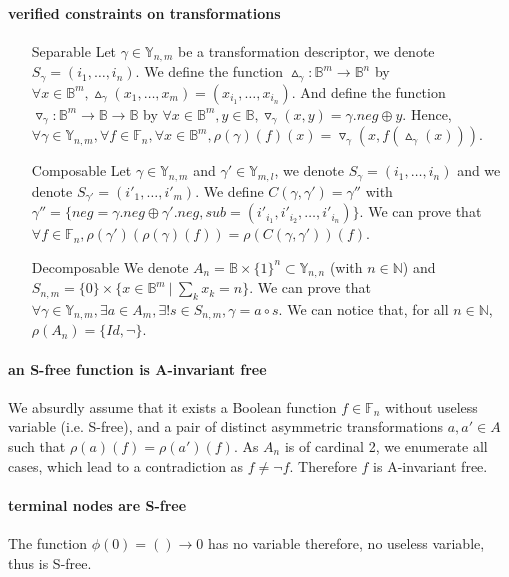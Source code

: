 \documentclass[a4paper,10pt]{article}
\newcommand{\N}{\mathbb{N}}%
\newcommand{\B}{\mathbb{B}}
\newcommand{\F}{\mathbb{F}}
\newcommand{\Y}{\mathbb{Y}}
\begin{document}
\paragraph{verified constraints on transformations}
\begin{itemize}
\item[Separable]
Let $\gamma\in\Y_{n, m}$ be a transformation descriptor, we denote $S_{\gamma} = (i_1, \dots, i_n)$.
We define the function $\vartriangle_\gamma : \B^m \longrightarrow \B^n$ by $\forall x\in\B^m, \vartriangle_\gamma(x_1, \dots, x_m) = (x_{i_1}, \dots, x_{i_n})$.
And define the function $\triangledown_\gamma : \B^m \longrightarrow \B \longrightarrow \B$ by $\forall x\in\B^m, y\in\B, \triangledown_\gamma(x, y) = \gamma.neg \oplus y$.
Hence, $\forall \gamma\in\Y_{n, m},\forall f\in\F_n, \forall x\in\B^m, \rho(\gamma)(f)(x) = \triangledown_\gamma(x, f(\vartriangle_\gamma(x)))$.
\item[Composable]
Let $\gamma\in\Y_{n, m}$ and $\gamma'\in\Y_{m, l}$, we denote $S_{\gamma} = (i_1, \dots, i_n)$ and we denote $S_{\gamma'} = (i'_1, \dots, i'_m)$.
We define $C(\gamma, \gamma') = \gamma''$ with $\gamma'' = \{neg = \gamma.neg \oplus \gamma'.neg, sub = (i'_{i_1}, i'_{i_2}, \dots, i'_{i_n})\}$.
We can prove that $\forall f\in\F_n, \rho(\gamma')(\rho(\gamma)(f)) = \rho(C(\gamma, \gamma'))(f)$.
\item[Decomposable]
We denote $A_n = \B\times\{1\}^n \subset\Y_{n, n}$ (with $n\in\N$) and $S_{n, m} = \{0\}\times\{x\in\B^m~|~\sum_k x_k = n\}$.
We can prove that $\forall \gamma \in \Y_{n, m}, \exists a \in A_m, \exists! s \in S_{n, m},  \gamma = a \circ s$.
We can notice that, for all $n\in\N$, $\rho(A_n) = \{Id, \lnot\}$.
\end{itemize}


\paragraph{an S-free function is A-invariant free\\}
We absurdly assume that it exists a Boolean function $f\in\F_n$ without useless variable (i.e. S-free), and a pair of distinct asymmetric transformations $a, a'\in A$ such that $\rho(a)(f) = \rho(a')(f)$.
As $A_n$ is of cardinal 2, we enumerate all cases, which lead to a contradiction as $f \neq \lnot f$.
Therefore $f$ is A-invariant free.

\paragraph{terminal nodes are S-free\\}
The function $\phi(0) = () \longrightarrow 0$ has no variable therefore, no useless variable, thus is S-free.
\end{document}
